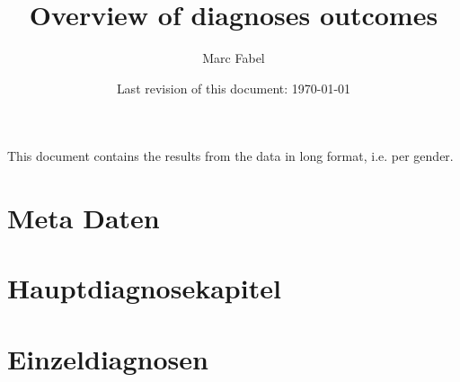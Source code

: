 \documentclass{scrartcl} %
\author{Marc Fabel}
\title{Overview of diagnoses outcomes}
\date{Last revision of this document: \today}
\begin{document}
\maketitle
This document contains the results from the data in long format, i.e. per gender.

\newpage


\section{Meta Daten}




\section{Hauptdiagnosekapitel}


























\section{Einzeldiagnosen}










\end{document}
